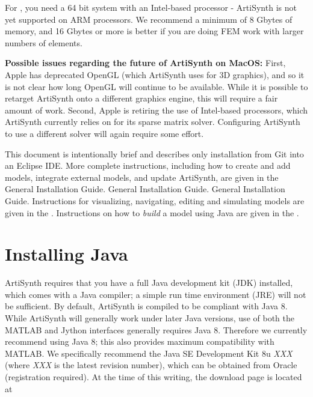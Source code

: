 For \SYSTEM{}, you need a 64 bit system with an Intel-based processor -
ArtiSynth is not yet supported on ARM processors. We recommend a
minimum of 8 Gbytes of memory, and 16 Gbytes or more is better if you
are doing FEM work with larger numbers of elements.

\ifMacOS 
\begin{sideblock}
{\bf Possible issues regarding the future of ArtiSynth on MacOS:}
First, Apple has deprecated OpenGL (which ArtiSynth uses for 3D
graphics), and so it is not clear how long OpenGL will continue to be
available.  While it is possible to retarget ArtiSynth onto a
different graphics engine, this will require a fair amount of work.
Second, Apple is retiring the use of Intel-based processors, which
ArtiSynth currently relies on for its sparse matrix
solver. Configuring ArtiSynth to use a different solver will again
require some effort.
\end{sideblock}
\fi

This document is intentionally brief and describes only installation
from Git into an Eclipse IDE. More complete instructions,
including how to create and add models, integrate external
models, and update ArtiSynth, are given in the
\ifLinux
{}%
{General Installation Guide}.
\fi
\ifWindows
{}%
{General Installation Guide}.
\fi
\ifMacOS
{}%
{General Installation Guide}.
\fi
Instructions for visualizing, navigating, editing
and simulating models are given in the 
.
Instructions on how to {\it build} a model using Java are given in
the .

\section{Installing Java}
\label{InstallingJava:sec}

ArtiSynth requires that you have a full Java development kit (JDK)
installed, which comes with a Java compiler; a simple run time
environment (JRE) will not be sufficient. 
By default, ArtiSynth is compiled to be compliant with Java 8. While
ArtiSynth will generally work under later Java versions, use
of both the MATLAB and Jython interfaces generally requires Java 8.
Therefore we currently recommend using Java
8; this also provides maximum compatibility with MATLAB.
We specifically recommend the Java SE Development Kit 8u{\it
XXX} (where {\it XXX} is the latest revision number), which can be
obtained from Oracle (registration required).  At the time of this
writing, the download page is located at


